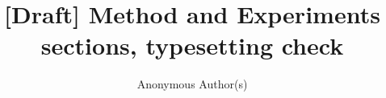 \documentclass[sigconf,nonacm]{acmart}
\begin{document}
\title{[Draft] Method and Experiments sections, typesetting check}
\author{Anonymous Author(s)}
\renewcommand{\shortauthors}{Anon.}

\maketitle





\end{document}
